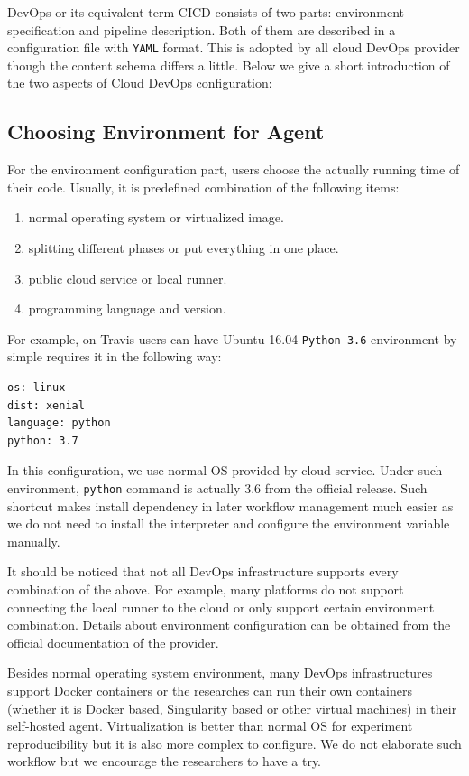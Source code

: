 \documentclass{IEEEcsmag}
\begin{document}
DevOps or its equivalent term CICD consists of two parts: environment specification and pipeline description. 
Both of them are described in a configuration file with \texttt{YAML} format. This is adopted by all cloud DevOps provider though the content schema differs a little. Below we give a short introduction of the two aspects of Cloud DevOps configuration:
\subsection{Choosing Environment for Agent}
For the environment configuration part, users choose the actually running time of their code. Usually, it is predefined combination of the following items:
\begin{enumerate}
\item normal operating system or virtualized image.
\item splitting different phases or put everything in one place.
\item public cloud service or local runner.
\item programming language and version.
\end{enumerate}

For example, on Travis users can have Ubuntu 16.04 \texttt{Python 3.6} environment by simple requires it in the following way:
\begin{lstlisting}[caption={environment configuration}]
os: linux
dist: xenial
language: python
python: 3.7
\end{lstlisting}

In this configuration, we use normal OS provided by cloud service. Under such environment, \texttt{python} command is actually 3.6 from the official release.
Such shortcut makes install dependency in later workflow management much easier as we do not need to install the interpreter and configure the environment variable manually.

It should be noticed that not all DevOps infrastructure supports every combination of the above. For example, many platforms do not support connecting the local runner to the cloud or only support certain environment combination. Details about environment configuration can be obtained from the official documentation of the provider.

Besides normal operating system environment, many DevOps infrastructures support Docker containers or the researches can run their own containers (whether it is Docker based, Singularity based or other virtual machines) in their self-hosted agent. Virtualization is better than normal OS for experiment reproducibility but it is also more complex to configure. We do not elaborate such workflow but we encourage the researchers to have a try.
\end{document}
